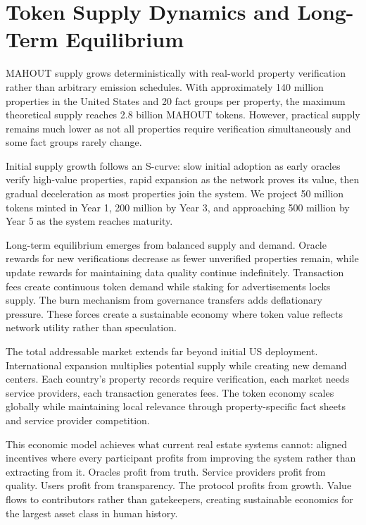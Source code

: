 \section{Token Supply Dynamics and Long-Term Equilibrium}

MAHOUT supply grows deterministically with real-world property verification rather than arbitrary emission schedules. With approximately 140 million properties in the United States and 20 fact groups per property, the maximum theoretical supply reaches 2.8 billion MAHOUT tokens. However, practical supply remains much lower as not all properties require verification simultaneously and some fact groups rarely change.

Initial supply growth follows an S-curve: slow initial adoption as early oracles verify high-value properties, rapid expansion as the network proves its value, then gradual deceleration as most properties join the system. We project 50 million tokens minted in Year 1, 200 million by Year 3, and approaching 500 million by Year 5 as the system reaches maturity.

Long-term equilibrium emerges from balanced supply and demand. Oracle rewards for new verifications decrease as fewer unverified properties remain, while update rewards for maintaining data quality continue indefinitely. Transaction fees create continuous token demand while staking for advertisements locks supply. The burn mechanism from governance transfers adds deflationary pressure. These forces create a sustainable economy where token value reflects network utility rather than speculation.

The total addressable market extends far beyond initial US deployment. International expansion multiplies potential supply while creating new demand centers. Each country's property records require verification, each market needs service providers, each transaction generates fees. The token economy scales globally while maintaining local relevance through property-specific fact sheets and service provider competition.

This economic model achieves what current real estate systems cannot: aligned incentives where every participant profits from improving the system rather than extracting from it. Oracles profit from truth. Service providers profit from quality. Users profit from transparency. The protocol profits from growth. Value flows to contributors rather than gatekeepers, creating sustainable economics for the largest asset class in human history.
